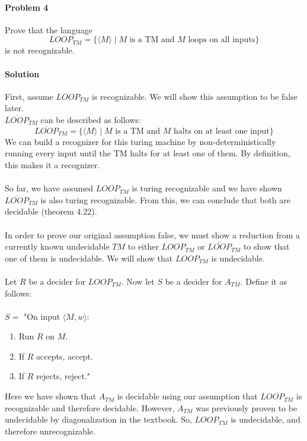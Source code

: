 \documentclass{article}
\begin{document}
\paragraph{Problem 4} Prove that the language
\[ LOOP_{TM} = \{ \langle M \rangle \;|\; M \text{ is a TM and $M$ loops on all inputs} \} \]
is not recognizable.
\\
\paragraph{Solution} First, assume $LOOP_{TM}$ is recognizable. We will show this assumption to be false later.
\\$\overline{LOOP}_{TM}$ can be described as follows:
\[\overline{ LOOP}_{TM} = \{ \langle M \rangle \;|\; M \text{ is a TM and $M$ halts on at least one input} \} \]
\noindent We can build a recognizer for this turing machine by non-deterministically running every input until the TM halts for at least one of them. By definition, this makes it a recognizer.
\\\\ So far, we have assumed $LOOP_{TM}$ is turing recognizable and we have shown $\overline{LOOP}_{TM}$ is also turing recognizable. From this, we can conclude that both are decidable (theorem 4.22). 
\\\\ In order to prove our original assumption false, we must show a reduction from a currently known undecidable $TM$ to either $LOOP_{TM}$ or $\overline{LOOP}_{TM}$ to show that one of them is undecidable. We will show that $LOOP_{TM}$ is undecidable.
\\\\ Let $R$ be a decider for $LOOP_{TM}$. Now let $S$ be a decider for $A_{TM}$. Define it as follows:
\\\\
\noindent $S = $ "On input $\langle M, w\rangle$: 
    \begin{enumerate}[\indent 1.]
    \item Run $R$ on $M$.
    \item If $R$ accepts, accept.
    \item If $R$ rejects, reject."
    \end{enumerate}
\noindent Here we have shown that $A_{TM}$ is decidable using our assumption that $LOOP_{TM}$ is recognizable and therefore decidable. However, $A_{TM}$ was previously proven to be undecidable by diagonalization in the textbook. So, $LOOP_{TM}$ is undecidable, and therefore unrecognizable. 
\end{document}
